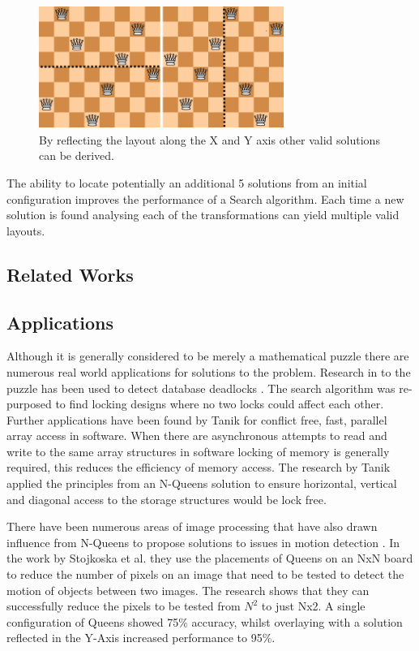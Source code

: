 \documentclass[a4paper,onecolumn,11pt]{article}
\begin{document}
\begin{figure}[!htbp]
	\centering	
	\includegraphics[width=8cm, height=4cm]{Valid8QueensReflected}
	\caption{By reflecting the layout along the X and Y axis other valid solutions can be derived.}
\end{figure}

The ability to locate potentially an additional 5 solutions from an initial configuration improves the performance of a Search algorithm. Each time a new solution is found analysing each of the transformations can yield multiple valid layouts.

\subsection{Related Works}


\subsection{Applications}

Although it is generally considered to be merely a mathematical puzzle there are numerous real world applications for solutions to the problem. Research in to the puzzle has been used to detect database deadlocks \cite{Deadlock}. The search algorithm was re-purposed to find locking designs where no two locks could affect each other. Further applications have been found by Tanik \cite{SIMD} \cite{Circulant} for conflict free, fast, parallel array access in software. When there are asynchronous attempts to read and write to the same array structures in software locking of memory is generally required, this reduces the efficiency of memory access. The research by Tanik applied the principles from an N-Queens solution to ensure horizontal, vertical and diagonal access to the storage structures would be lock free.

There have been numerous areas of image processing that have also drawn influence from N-Queens to propose solutions to issues in motion detection \cite{WSN}. In the work by Stojkoska et al. they use the placements of Queens on an NxN board to reduce the number of pixels on an image that need to be tested to detect the motion of objects between two images. The research shows that they can successfully reduce the pixels to be tested from $N^2$ to just Nx2. A single configuration of Queens showed 75\% accuracy, whilst overlaying with a solution reflected in the Y-Axis increased performance to 95\%.
\end{document}
